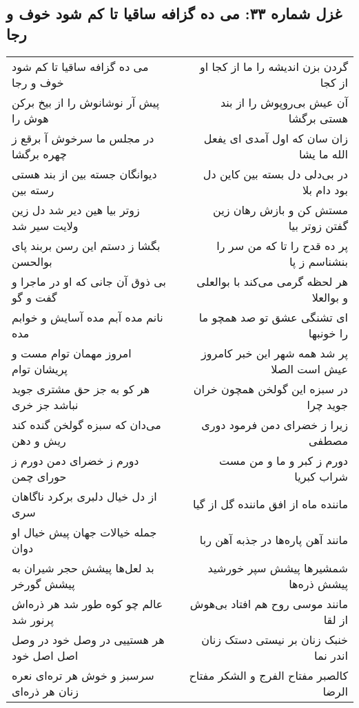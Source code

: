\begin{center}
\section*{غزل شماره ۳۳: می ده گزافه ساقیا تا کم شود خوف و رجا}
\label{sec:0033}
\begin{longtable}{l p{0.5cm} r}
می ده گزافه ساقیا تا کم شود خوف و رجا
&&
گردن بزن اندیشه را ما از کجا او از کجا
\\
پیش آر نوشانوش را از بیخ برکن هوش را
&&
آن عیش بی‌روپوش را از بند هستی برگشا
\\
در مجلس ما سرخوش آ برقع ز چهره برگشا
&&
زان سان که اول آمدی ای یفعل الله ما یشا
\\
دیوانگان جسته بین از بند هستی رسته بین
&&
در بی‌دلی دل بسته بین کاین دل بود دام بلا
\\
زوتر بیا هین دیر شد دل زین ولایت سیر شد
&&
مستش کن و بازش رهان زین گفتن زوتر بیا
\\
بگشا ز دستم این رسن بربند پای بوالحسن
&&
پر ده قدح را تا که من سر را بنشناسم ز پا
\\
بی ذوق آن جانی که او در ماجرا و گفت و گو
&&
هر لحظه گرمی می‌کند با بوالعلی و بوالعلا
\\
نانم مده آبم مده آسایش و خوابم مده
&&
ای تشنگی عشق تو صد همچو ما را خونبها
\\
امروز مهمان توام مست و پریشان توام
&&
پر شد همه شهر این خبر کامروز عیش است الصلا
\\
هر کو به جز حق مشتری جوید نباشد جز خری
&&
در سبزه این گولخن همچون خران جوید چرا
\\
می‌دان که سبزه گولخن گنده کند ریش و دهن
&&
زیرا ز خضرای دمن فرمود دوری مصطفی
\\
دورم ز خضرای دمن دورم ز حورای چمن
&&
دورم ز کبر و ما و من مست شراب کبریا
\\
از دل خیال دلبری برکرد ناگاهان سری
&&
ماننده ماه از افق ماننده گل از گیا
\\
جمله خیالات جهان پیش خیال او دوان
&&
مانند آهن پاره‌ها در جذبه آهن ربا
\\
بد لعل‌ها پیشش حجر شیران به پیشش گورخر
&&
شمشیرها پیشش سپر خورشید پیشش ذره‌ها
\\
عالم چو کوه طور شد هر ذره‌اش پرنور شد
&&
مانند موسی روح هم افتاد بی‌هوش از لقا
\\
هر هستییی در وصل خود در وصل اصل اصل خود
&&
خنبک زنان بر نیستی دستک زنان اندر نما
\\
سرسبز و خوش هر تره‌ای نعره زنان هر ذره‌ای
&&
کالصبر مفتاح الفرج و الشکر مفتاح الرضا
\\

\end{longtable}
\end{center}

